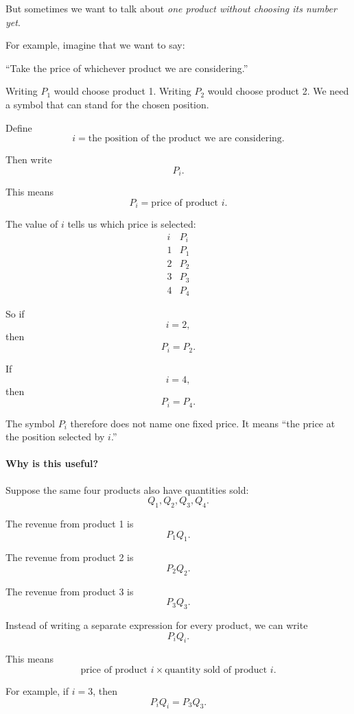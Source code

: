 	But sometimes we want to talk about \emph{one product without choosing its number yet}.
	
	For example, imagine that we want to say:
	
	\begin{center}
		``Take the price of whichever product we are considering.''
	\end{center}
	
	Writing $P_1$ would choose product 1. Writing $P_2$ would choose product 2. We need a symbol that can stand for the chosen position.
	
	Define
	\[
	i=\text{the position of the product we are considering}.
	\]
	
	Then write
	\[
	P_i.
	\]
	
	This means
	\[
	P_i=\text{price of product }i.
	\]
	
	The value of $i$ tells us which price is selected:
	\[
	\begin{array}{c|c}
		i & P_i \\
		\hline
		1 & P_1 \\
		2 & P_2 \\
		3 & P_3 \\
		4 & P_4
	\end{array}
	\]
	
	So if
	\[
	i=2,
	\]
	then
	\[
	P_i=P_2.
	\]
	
	If
	\[
	i=4,
	\]
	then
	\[
	P_i=P_4.
	\]
	
	The symbol $P_i$ therefore does not name one fixed price. It means
	``the price at the position selected by $i$.''
	
	\paragraph{Why is this useful?}
	
	Suppose the same four products also have quantities sold:
	\[
	Q_1,Q_2,Q_3,Q_4.
	\]
	
	The revenue from product 1 is
	\[
	P_1Q_1.
	\]
	
	The revenue from product 2 is
	\[
	P_2Q_2.
	\]
	
	The revenue from product 3 is
	\[
	P_3Q_3.
	\]
	
	Instead of writing a separate expression for every product, we can write
	\[
	P_iQ_i.
	\]
	
	This means
	\[
	\text{price of product }i
	\times
	\text{quantity sold of product }i.
	\]
	
	For example, if $i=3$, then
	\[
	P_iQ_i=P_3Q_3.
	\]
	
